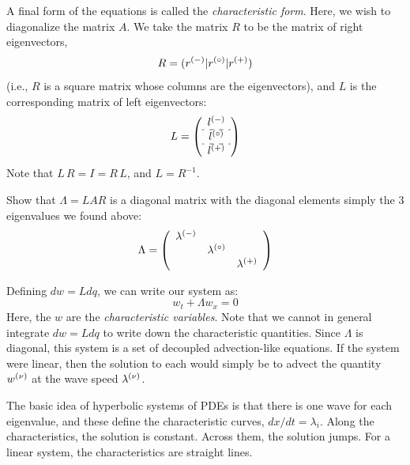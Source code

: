 A final form of the equations is called the {\em characteristic form}.  Here,
we wish to diagonalize the matrix $A$.  We take the matrix $R$ to be the
matrix of right eigenvectors,
\begin{equation}
R = (r^{(-)} | r^{(\circ)} | r^{(+)} )
\end{equation}
(i.e., $R$ is a square matrix whose columns are the eigenvectors),
and $L$
is the corresponding matrix of left eigenvectors:
\begin{equation}
L = \left ( \begin{array}{c} l^\evm \\
                             \hdashline
                             l^\evz \\
                             \hdashline
                             l^\evp \end{array} \right )
\end{equation}
Note that $L\, R = I = R\, L$, and $L = R^{-1}$.
\begin{exercise}
{
Show that $\Lambda = L A R$ is a diagonal matrix with the diagonal elements
simply the 3 eigenvalues we found above:
\begin{equation}
\Lambda =
   \left ( \begin{array}{ccc}
             \lambda^{(-)} &              & \\
                          & \lambda^{(\circ)} & \\
                          &              & \lambda^{(+)} \end{array} \right )
\end{equation}
}
\end{exercise}
Defining $dw = L dq$, we can write our system as:
\begin{equation}
w_t + \Lambda w_x = 0
\end{equation}
Here, the $w$ are the {\em characteristic variables}.  Note that we cannot
in general integrate $dw = L dq$ to write down the characteristic
quantities.  Since $\Lambda$ is diagonal, this system is a set of
decoupled advection-like equations.  If the system were linear, then the
solution to each would simply be to advect the quantity $w^{(\nu)}$ at
the wave speed $\lambda^{(\nu)}$.

The basic idea of hyperbolic systems of PDEs is that there is one wave
for each eigenvalue, and these define the characteristic curves,
$dx/dt = \lambda_i$.  Along the characteristics, the solution is
constant.  Across them, the solution jumps.  For a linear system, the
characteristics are straight lines.

